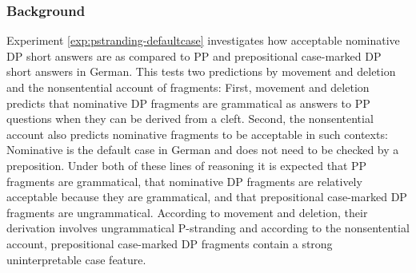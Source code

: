 \subsubsection{Background}
Experiment \ref{exp:pstranding-defaultcase} investigates how acceptable nominative DP short answers are as compared to PP and prepositional case-marked DP short answers in German. This tests two predictions by movement and deletion and the nonsentential account of fragments:  First, movement and deletion predicts that nominative DP fragments are grammatical as answers to PP questions when they can be derived from a cleft. Second, the nonsentential account also predicts nominative fragments to be acceptable in such contexts: Nominative is the default case in German and does not need to be checked by a preposition. Under both of these lines of reasoning it is expected that PP fragments are grammatical, that nominative DP fragments are relatively acceptable because they are grammatical, and that prepositional case-marked DP fragments are ungrammatical. According to movement and deletion, their derivation involves ungrammatical P-stranding  and according to the nonsentential account, prepositional case-marked DP fragments contain a strong uninterpretable case feature.

